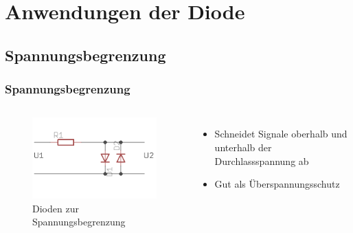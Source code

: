 \section*{Anwendungen der Diode}

\subsection*{Spannungs\-begrenzung}
\begin{frame}
  \frametitle{Spannungsbegrenzung}
  \begin{columns}[c]
    \begin{center}
      \begin{figure}
        \includegraphics[width=1\textwidth,height=.75\textheight,keepaspectratio]{a05/spannungsBegrenz.png}
        \caption{Dioden zur Spannungsbegrenzung}
      \end{figure}
    \end{center}
    \begin{itemize}
      \item Schneidet Signale oberhalb und unterhalb der Durchlassspannung ab
      \item Gut als Überspannungsschutz
    \end{itemize}
  \end{columns}
\end{frame}



